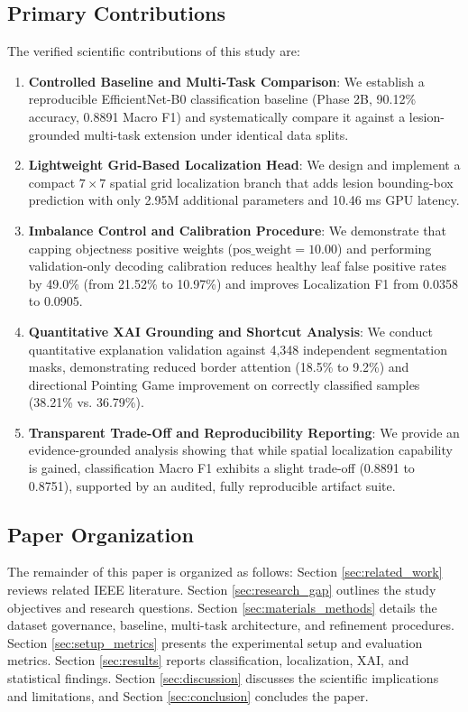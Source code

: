 \subsection{Primary Contributions}
The verified scientific contributions of this study are:
\begin{enumerate}
    \item \textbf{Controlled Baseline and Multi-Task Comparison}: We establish a reproducible EfficientNet-B0 classification baseline (Phase 2B, 90.12\% accuracy, 0.8891 Macro F1) and systematically compare it against a lesion-grounded multi-task extension under identical data splits.
    \item \textbf{Lightweight Grid-Based Localization Head}: We design and implement a compact $7\times 7$ spatial grid localization branch that adds lesion bounding-box prediction with only 2.95M additional parameters and 10.46 ms GPU latency.
    \item \textbf{Imbalance Control and Calibration Procedure}: We demonstrate that capping objectness positive weights ($\text{pos\_weight}=10.00$) and performing validation-only decoding calibration reduces healthy leaf false positive rates by 49.0\% (from 21.52\% to 10.97\%) and improves Localization F1 from 0.0358 to 0.0905.
    \item \textbf{Quantitative XAI Grounding and Shortcut Analysis}: We conduct quantitative explanation validation against 4,348 independent segmentation masks, demonstrating reduced border attention (18.5\% to 9.2\%) and directional Pointing Game improvement on correctly classified samples (38.21\% vs. 36.79\%).
    \item \textbf{Transparent Trade-Off and Reproducibility Reporting}: We provide an evidence-grounded analysis showing that while spatial localization capability is gained, classification Macro F1 exhibits a slight trade-off (0.8891 to 0.8751), supported by an audited, fully reproducible artifact suite.
\end{enumerate}

\subsection{Paper Organization}
The remainder of this paper is organized as follows: Section \ref{sec:related_work} reviews related IEEE literature. Section \ref{sec:research_gap} outlines the study objectives and research questions. Section \ref{sec:materials_methods} details the dataset governance, baseline, multi-task architecture, and refinement procedures. Section \ref{sec:setup_metrics} presents the experimental setup and evaluation metrics. Section \ref{sec:results} reports classification, localization, XAI, and statistical findings. Section \ref{sec:discussion} discusses the scientific implications and limitations, and Section \ref{sec:conclusion} concludes the paper.
